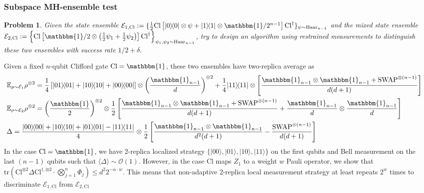 \documentclass[aps,%
twocolumn,%
floatfix,%
pra,%
amsfonts,%
groupedaddress,%
superscriptaddress]{revtex4-2}%
\newtheorem{problem}{Problem}
\newcommand{\bra}[1]{\langle #1\rvert}
\newcommand{\ket}[1]{\lvert #1\rangle}
\newcommand{\1}{\mathbbm{1}}
\begin{document}
\subsubsection{Subspace \textbf{MH}-ensemble test}
\begin{problem}
    Given the state ensemble $\mathcal{E}_{1,\mathrm{Cl}}:= \{\frac{1}{2} \mathrm{Cl}\left[\ket{0}\!\bra{0} \otimes \psi + \ket{1}\!\bra{1} \otimes \1/{2^{n-1}}\right]\mathrm{Cl}^\dagger\}_{\psi \sim \mathrm{Haar}_{n-1}}$ and the mixed state ensemble $\mathcal{E}_{2,\mathrm{Cl}}:=\left\{\mathrm{Cl}\left[{\1}/{2} \otimes \left(\frac{1}{2}\psi_1 + \frac{1}{2}\psi_2\right)\right]\mathrm{Cl}^\dagger\right\}_{\psi_1,\psi_2 \sim \mathrm{Haar}_{n-1}}$, try to design an algorithm using restrained measurements to distinguish these two ensembles with success rate $1/2 + \delta$.
\end{problem}
Given a fixed $n$-qubit Clifford gate $\mathrm{Cl} = \1$, these two ensembles have two-replica average as
\begin{align}
    &\mathbb{E}_{\rho \sim \mathcal{E}_1}\rho^{\otimes 2} = \frac{1}{4}\left[\ket{01}\!\bra{01} + \ket{10}\!\bra{10} + \ket{00}\!\bra{00}\right] \otimes \left(\frac{\1_{n-1}}{d}\right)^{\otimes 2} + \frac{1}{4}\ket{11}\!\bra{11} \otimes \left[\frac{\1_{n-1} \otimes \1_{n-1} + \mathrm{SWAP}^{\otimes (n-1)}}{d(d+1)}\right]\\
    &\mathbb{E}_{\rho \sim \mathcal{E}_2} \rho^{\otimes 2} = \left(\frac{\1}{2}\right)^{\otimes 2} \otimes \frac{1}{2} \left[\frac{\1_{n-1} \otimes \1_{n-1} + \mathrm{SWAP}^{\otimes (n-1)}}{d(d+1)} + \frac{\1_{n-1}}{d} \otimes \frac{\1_{n-1}}{d}\right]\\
    &\Delta = \frac{\ket{00}\!\bra{00} + \ket{10}\!\bra{10} +\ket{01}\!\bra{01} -\ket{11}\!\bra{11}}{4} \otimes \frac{1}{2}\left[\frac{\1_{n-1} \otimes \1_{n-1}}{d^2(d+1)} - \frac{\mathrm{SWAP}^{\otimes (n-1)}}{d(d+1)} \right]
\end{align}
In the case $\mathrm{Cl} = \1$, we have 2-replica localized strategy $\{\ket{00},\ket{01},\ket{10},\ket{11}\}$ on the first qubits and Bell measurement on the last $(n-1)$ qubits such that $\langle \Delta \rangle \sim \mathcal{O}(1)$.  
However, in the case $\mathrm{Cl}$ maps $Z_1$ to a weight $w$ Pauli operator, we show that $\mathrm{tr}(\mathrm{Cl}^{\otimes 2} \Delta \mathrm{Cl}^{\dagger,\otimes 2} \cdot \bigotimes_{j=1}^n\Phi_j) \leq d^2 2^{-\alpha \cdot w}$. This means that non-adaptive 2-replica local measurement strategy at least repeats $2^w$ times to discriminate $\mathcal{E}_{1,\mathrm{Cl}}$ from $\mathcal{E}_{2,\mathrm{Cl}}$
\end{document}
